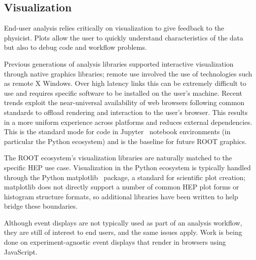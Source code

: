 
\subsection{Visualization}

End-user analysis relies critically on visualization to give feedback to the physicist. Plots allow the user to quickly understand characteristics of the data but also to debug code and workflow problems.

Previous generations of analysis libraries supported interactive visualization through native graphics libraries; remote use involved the use of technologies such as remote X Windows. Over high latency links this can be extremely difficult to use and requires specific software to be installed on the user's machine. Recent trends exploit the near-universal availability of web browsers following common standards to offload rendering and interaction to the user's browser. This results in a more uniform experience across platforms and reduces external dependencies. This is the standard mode for code in Jupyter~\cite{soton403913} notebook environments (in particular the Python ecosystem) and is the baseline for future ROOT graphics.

The ROOT ecosystem's visualization libraries are naturally matched to the specific HEP use case. Visualization in the Python ecosystem is typically handled through the Python matplotlib~\cite{Hunter:2007} package, a standard for scientific plot creation; matplotlib does not directly support a number of common HEP plot forms or histogram structure formats, so additional libraries have been written to help bridge these boundaries.

Although event displays are not typically used as part of an analysis workflow, they are still of interest to end users, and the same issues apply. Work is being done on experiment-agnostic event displays that render in browsers using JavaScript.

